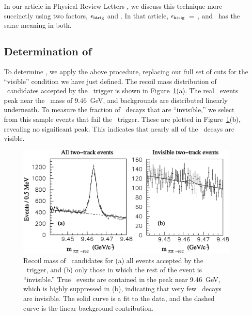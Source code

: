 \documentclass{cornell}
\begin{document}
In our article in Physical Review Letters \cite{me}, we discuss this
technique more succinctly using two factors, $\epsilon_{\mbox{\scriptsize htrig}}$
and \ecuts.  In that article, $\epsilon_{\mbox{\scriptsize htrig}}$~=~\evis,
and \ecuts\ has the same meaning in both.

\subsection{Determination of \boldmath \evis}

To determine \evis, we apply the above procedure, replacing our full
set of cuts for the ``visible'' condition we have just defined.  The
recoil mass distribution of \pipi\ candidates accepted by the
\twotrack\ trigger is shown in Figure~\ref{pipitwotrack}(a).  The real
\twotoone\ events peak near the \us\ mass of 9.46~GeV, and backgrounds
are distributed linearly underneath.  To measure the fraction of \us\
decays that are ``invisible,'' we select from this sample events that
fail the \hadron\ trigger.  These are plotted in Figure~\ref{pipitwotrack}(b), revealing no significant peak.  This indicates
that nearly all of the \us\ decays are visible.

\begin{figure}[p]
  \begin{center}
    \includegraphics[width=\linewidth]{pipitwotrack}
  \end{center}
  \caption[\pipi\ recoil mass for events from the \twotrack\
  trigger]{\label{pipitwotrack} Recoil mass of \pipi\ candidates for
  (a) all events accepted by the \twotrack\ trigger, and (b) only
  those in which the rest of the event is ``invisible.''  True
  \twotoone\ events are contained in the peak near 9.46~GeV, which is
  highly suppressed in (b), indicating that very few \us\ decays are
  invisible.  The solid curve is a fit to the data, and the dashed
  curve is the linear background contribution.}
\end{figure}
\end{document}
